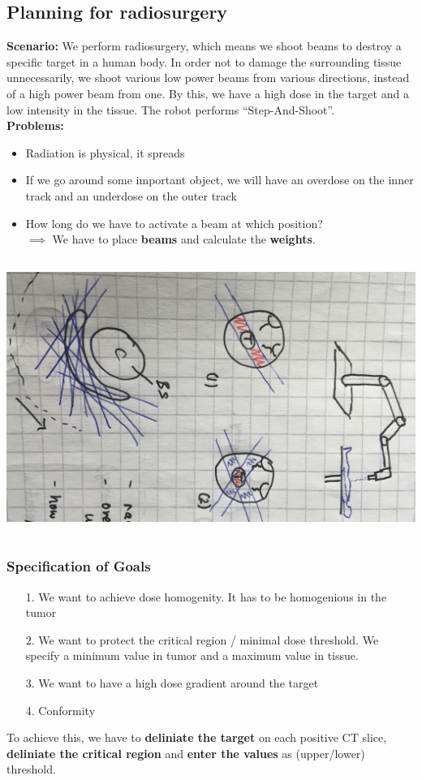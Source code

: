 \documentclass{exerciseBlue}
\begin{document}
\subsection{Planning for radiosurgery}
\textbf{Scenario:} We perform radiosurgery, which means we shoot beams to destroy a specific target in a human body. In order not to damage the surrounding tissue unnecessarily, we shoot various low power beams from various directions, instead of a high power beam from one. By this, we have a high dose in the target and a low intensity in the tissue. The robot performs ``Step-And-Shoot''.\\
\textbf{Problems:}
\begin{itemize}
	\item Radiation is physical, it spreads
	\item If we go around some important object, we will have an overdose on the inner track and an underdose on the outer track
	\item How long do we have to activate a beam at which position?\\
	$\implies$ We have to place \textbf{beams} and calculate the \textbf{weights}.
\end{itemize}
\begin{center}
	\includegraphics[height = 9cm]{Images/TreatmentPlanning}
\end{center}
\subsubsection{Specification of Goals}
\begin{itemize}
	\item[1.] We want to achieve dose homogenity. It has to be homogenious in the tumor
	\item[2.] We want to protect the critical region / minimal dose threshold. We specify a minimum value in tumor and a maximum value in tissue.
	\item[3.] We want to have a high dose gradient around the target
	\item[4.] Conformity
\end{itemize}
To achieve this, we have to \textbf{deliniate the target} on each positive CT slice, \textbf{deliniate the critical region} and \textbf{enter the values} as (upper/lower) threshold.
\end{document}
